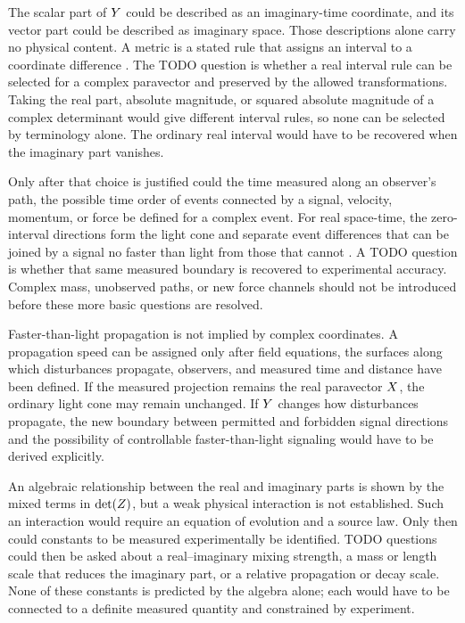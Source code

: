The scalar part of \(Y\) could be described as an imaginary-time
coordinate, and its vector part could be described as imaginary space.
Those descriptions alone carry no physical content. A metric is a stated
rule that assigns an interval to a coordinate difference
\cite{minkowski1908}. The TODO question is whether a real interval rule can
be selected for a complex paravector and preserved by the allowed
transformations. Taking the real part, absolute magnitude, or squared
absolute magnitude of a complex determinant would give different interval
rules, so none can be selected by terminology alone. The ordinary real
interval would have to be recovered when the imaginary part vanishes.

Only after that choice is justified could the time measured along an
observer's path, the possible time order of events connected by a signal,
velocity, momentum, or force be defined for a complex event. For real
space-time, the zero-interval directions form the light cone and separate
event differences that can be joined by a signal no faster than light from
those that cannot \cite{einstein1905,minkowski1908}. A TODO question is
whether that same measured boundary is recovered to experimental accuracy.
Complex mass, unobserved paths, or new force channels should not be introduced
before these more basic questions are resolved.

Faster-than-light propagation is not implied by complex coordinates. A
propagation speed can be assigned only after field equations, the surfaces
along which disturbances propagate, observers, and measured time and distance
have been defined. If
the measured projection remains the real paravector \(X\), the ordinary
light cone may remain unchanged. If \(Y\) changes how disturbances
propagate, the new boundary between permitted and forbidden signal directions
and the possibility of controllable faster-than-light signaling would have
to be derived explicitly.

An algebraic relationship between the real and imaginary parts is shown by
the mixed terms in \(\operatorname{det}\!\left(Z\right)\), but a weak physical interaction is not
established. Such an interaction would require an equation of evolution and
a source law. Only then could constants to be measured experimentally be
identified. TODO questions could then be asked about a real--imaginary mixing
strength, a mass or length scale that reduces the imaginary part, or a
relative propagation or decay scale. None of these constants is predicted by
the algebra alone; each would have to be connected to a definite measured
quantity and constrained by experiment.

